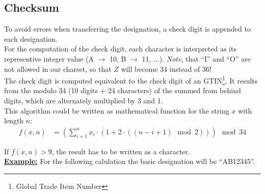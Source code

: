 %
%
%
%
%
%
%

\subsection{Checksum}

To avoid errors when transferring the designation, a check digit is appended to
each designation. \\

For the computation of the check digit, each character is interpreted as its
representive integer value (A $\rightarrow$ 10, B $\rightarrow$ 11, ...).
\textit{Note}, that ``I'' and ``O'' are not allowed in our charset, so that $Z$
will become 34 instead of 36! \\

The check digit is computed equivalent to the check digit of an
GTIN\footnote{Global Trade Item Number}. It results from the modulo 34 (10
digits + 24 characters) of the summed from behind digits, which are alternately
multiplied by 3 and 1. \\


This algorithm could be written as mathematical function for the string $x$ with
length $n$:
\begin{align*}
	f(x, n) &= \left(\sum_{i=1}^{n} x_i \cdot \left(1 + 2 \cdot \left( \left(
		n - i + 1 \right) \mod 2 \right) \right) \right) \mod 34
\end{align*}

If $f(x, n) > 9$, the result has to be written as a character. \\


\textbf{\underline{Example:}}
For the following calulation the basic designation will be ``AB12345''.

